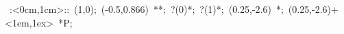 \hbox{
\xy    <5cm,0cm>:<0cm,1cm>::
       (1,0); (-0.5,0.866) **\dir{-}; ?(0)*\dir{<}; ?(1)*\dir{>};
       (0.25,-2.6) *{\bullet};
       (0.25,-2.6)+<1em,1ex> *{P};
\endxy}
